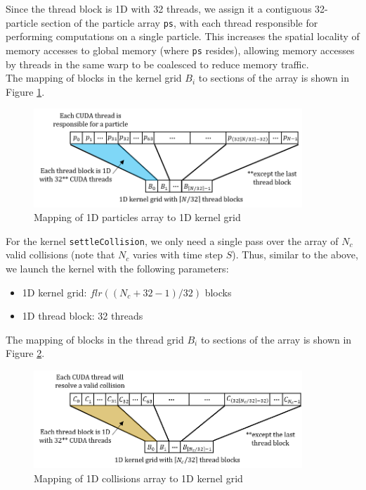 \documentclass[12pt]{article}
\begin{document}
Since the thread block is 1D with 32 threads, we assign it a contiguous 32-particle section of the particle array \texttt{ps}, with each thread responsible for performing computations on a single particle. This increases the spatial locality of memory accesses to global memory (where \texttt{ps} resides), allowing memory accesses by threads in the same warp to be coalesced to reduce memory traffic.\\

The mapping of blocks in the kernel grid $B_i$ to sections of the array is shown in Figure \ref{fig:linearParticleMapping}.

\begin{figure}[H]
    \centering
    \includegraphics[width=0.9\textwidth]{reportAssets/chap3particleArrayMapping.png}
    \caption{Mapping of 1D particles array to 1D kernel grid}
    \label{fig:linearParticleMapping}
\end{figure}

For the kernel \texttt{settleCollision}, we only need a single pass over the array of $N_c$ valid collisions (note that $N_c$ varies with time step $S$). Thus, similar to the above, we launch the kernel with the following parameters:
\begin{itemize}
    \item 1D kernel grid: $flr((N_c + 32 - 1) / 32)$ blocks
    \item 1D thread block: 32 threads
\end{itemize}

The mapping of blocks in the thread grid $B_i$ to sections of the array is shown in Figure \ref{fig:linearCollisionMapping}.

\begin{figure}[H]
    \centering
    \includegraphics[width=0.9\textwidth]{reportAssets/chap3collisionArrayMapping.png}
    \caption{Mapping of 1D collisions array to 1D kernel grid}
    \label{fig:linearCollisionMapping}
\end{figure}
\end{document}
